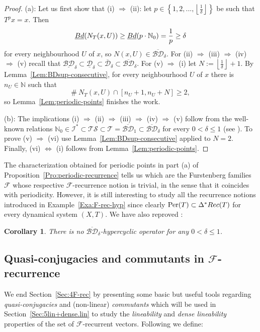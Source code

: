 \documentclass[openright,11pt]{article}
\theoremstyle{plain}
\newtheorem{corollary}[theorem]{Corollary}
\theoremstyle{definition}
\newcommand{\NN}{\mathbb{N}}
\newcommand{\Fc}{\mathcal{F}}
\newcommand{\Ic}{\mathcal{I}}
\newcommand{\Tc}{\mathcal{T}}
\newcommand{\TS}{\mathcal{TS}}
\newcommand{\Per}{\operatorname{Per}}
\newcommand{\Rec}{\textup{Rec}}
\newcommand{\del}{\delta}
\newcommand{\Bdinf}{\underline{\textup{Bd}}}
\newcommand{\BDsup}{\overline{\mathcal{BD}}}
\newcommand{\BDinf}{\underline{\mathcal{BD}}}
\newcommand{\Dsup}{\overline{\mathcal{D}}}
\newcommand{\Dinf}{\underline{\mathcal{D}}}
\begin{document}
\begin{proof}
	(a): Let us first show that (i) $\Rightarrow$ (ii): let $p \in \left\{ 1,2,...,\left\lfloor\frac{1}{\del}\right\rfloor \right\}$ be such that $T^px=x$. Then 
	\[
	\Bdinf(N_T(x,U)) \geq \Bdinf(p\cdot\NN_0) = \frac{1}{p} \geq \delta
	\]
	for every neighbourhood $U$ of $x$, so $N(x,U) \in \BDsup_{\delta}$. For (ii) $\Rightarrow$ (iii) $\Rightarrow$ (iv) $\Rightarrow$ (v) recall that $\BDinf_{\del} \subset \Dinf_{\del} \subset \Dsup_{\del} \subset \BDsup_{\del}$. For (v) $\Rightarrow$ (i) let $N := \left\lfloor\frac{1}{\del}\right\rfloor + 1$. By Lemma~\ref{Lem:BDsup-consecutive}, for every neighbourhood $U$ of $x$ there is $n_U \in \NN$ such that
	\[
	\# \ N_T(x,U) \cap [n_U+1,n_U+N] \geq 2,
	\]
	so Lemma~\ref{Lem:periodic-points} finishes the work.\newpage
	
	(b): The implications (i) $\Rightarrow$ (ii) $\Rightarrow$ (iii) $\Rightarrow$ (iv) $\Rightarrow$ (v) follow from the well-known relations $\NN_0 \in \Ic^* \subset \TS \subset \Tc = \BDsup_1 \subset \BDsup_{\del}$ for every $0<\delta\leq 1$ (see \cite{BerDown2008,HS1998}). To prove (v) $\Rightarrow$ (vi) use Lemma~\ref{Lem:BDsup-consecutive} applied to $N=2$. Finally, (vi) $\Leftrightarrow$ (i) follows from Lemma~\ref{Lem:periodic-points}.
\end{proof}

The characterization obtained for periodic points in part (a) of Proposition~\ref{Pro:periodic-recurrence} tells us which are the Furstenberg families $\Fc$ whose respective $\Fc$-recurrence notion is trivial, in the sense that it coincides with periodicity. However, it is still interesting to study all the recurrence notions introduced in Example~\ref{Exa:F-rec-hyp} since clearly $\Per(T) \subset \Delta^*\Rec(T)$ for every dynamical system $(X,T)$. We have also reproved \cite[Proposition~3]{BMPP2016}:

\begin{corollary}
	There is no $\BDsup_{\delta}$-hypercyclic operator for any $0<\delta\leq 1$.
\end{corollary}

\subsection{Quasi-conjugacies and commutants in $\Fc$-recurrence}\label{SubSec:4.3qc.c}

We end Section~\ref{Sec:4F-rec} by presenting some basic but useful tools regarding {\em quasi-conjugacies} and (non-linear) {\em commutants} which will be used in Section~\ref{Sec:5lin+dense.lin} to study the {\em lineability} and {\em dense lineability} properties of the set of $\Fc$-recurrent vectors. Following \cite{Furstenberg1981_book,GrPe2011_book} we define:
\end{document}
